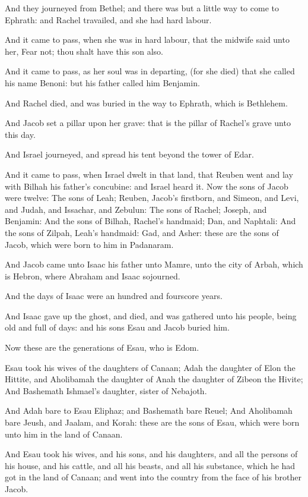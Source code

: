 \Verse And they journeyed from Bethel; and there was but a little way to come to Ephrath: and Rachel travailed, and she had hard labour.

\Verse And it came to pass, when she was in hard labour, that the midwife said unto her, Fear not; thou shalt have this son also.

\Verse And it came to pass, as her soul was in departing, (for she died) that she called his name Benoni: but his father called him Benjamin.

\Verse And Rachel died, and was buried in the way to Ephrath, which is Bethlehem.

\Verse And Jacob set a pillar upon her grave: that is the pillar of Rachel's grave unto this day.

\Verse And Israel journeyed, and spread his tent beyond the tower of Edar.

\Verse And it came to pass, when Israel dwelt in that land, that Reuben went and lay with Bilhah his father's concubine: and Israel heard it.  Now the sons of Jacob were twelve: \Verse The sons of Leah; Reuben, Jacob's firstborn, and Simeon, and Levi, and Judah, and Issachar, and Zebulun: \Verse The sons of Rachel; Joseph, and Benjamin: \Verse And the sons of Bilhah, Rachel's handmaid; Dan, and Naphtali: \Verse And the sons of Zilpah, Leah's handmaid: Gad, and Asher: these are the sons of Jacob, which were born to him in Padanaram.

\Verse And Jacob came unto Isaac his father unto Mamre, unto the city of Arbah, which is Hebron, where Abraham and Isaac sojourned.

\Verse And the days of Isaac were an hundred and fourscore years.

\Verse And Isaac gave up the ghost, and died, and was gathered unto his people, being old and full of days: and his sons Esau and Jacob buried him.

\Chapter
\Verse Now these are the generations of Esau, who is Edom.

\Verse Esau took his wives of the daughters of Canaan; Adah the daughter of Elon the Hittite, and Aholibamah the daughter of Anah the daughter of Zibeon the Hivite; \Verse And Bashemath Ishmael's daughter, sister of Nebajoth.

\Verse And Adah bare to Esau Eliphaz; and Bashemath bare Reuel; \Verse And Aholibamah bare Jeush, and Jaalam, and Korah: these are the sons of Esau, which were born unto him in the land of Canaan.

\Verse And Esau took his wives, and his sons, and his daughters, and all the persons of his house, and his cattle, and all his beasts, and all his substance, which he had got in the land of Canaan; and went into the country from the face of his brother Jacob.

